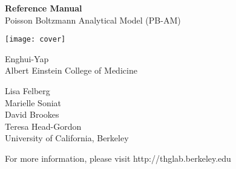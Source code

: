 

\begin{titlepage}
\begin{center}
\vspace{5pt}

	{\huge \textbf{Reference Manual}}\\ 
	\vspace{0.2cm}
	{\huge Poisson Boltzmann Analytical Model (PB-AM)}\\ 
\vspace{5pt}

\texttt{[image: cover]}

	Enghui-Yap\\  
	Albert Einstein College of Medicine\\ 
\vspace{5pt}	
	
	Lisa Felberg\\ 
	Marielle Soniat\\
	David Brookes \\ 
	Teresa Head-Gordon\\ 
	University of California, Berkeley  
\vspace{5pt}

For more information, please visit http://thglab.berkeley.edu \\
\vspace{5pt}
\end{center}
\end{titlepage}

